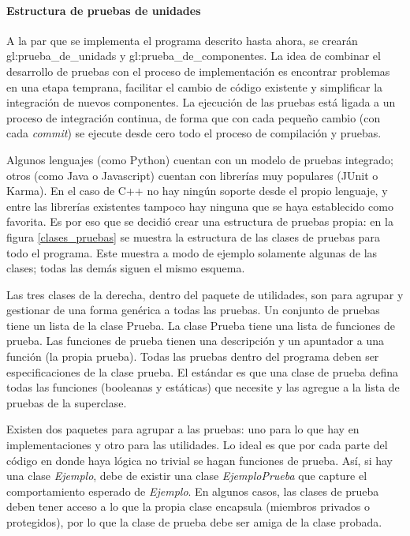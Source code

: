 %
%
%

\paragraph{Estructura de pruebas de unidades}

A la par que se implementa el programa descrito hasta ahora, se crearán
\glspl{gl:prueba_de_unidad} y \glspl{gl:prueba_de_componente}. La idea de
combinar el desarrollo de pruebas con el proceso de implementación es encontrar
problemas en una etapa temprana, facilitar el cambio de código existente y
simplificar la integración de nuevos componentes. La ejecución de las pruebas
está ligada a un proceso de integración continua, de forma que con
cada pequeño cambio (con cada \textit{commit}) se ejecute desde cero todo el
proceso de compilación y pruebas.

Algunos lenguajes (como Python) cuentan con un modelo de pruebas integrado;
otros (como Java o Javascript) cuentan con librerías muy populares (JUnit o
Karma). En el caso de C++ no hay ningún soporte desde el propio lenguaje, y
entre las librerías existentes tampoco hay ninguna que se haya establecido como
favorita. Es por eso que se decidió crear una estructura de pruebas propia:
en la figura \ref{clases_pruebas} se muestra la estructura de las clases de
pruebas para todo el programa. Este muestra a modo de ejemplo solamente algunas
de las clases; todas las demás siguen el mismo esquema.

Las tres clases de la derecha, dentro del paquete de utilidades, son para
agrupar y gestionar de una forma genérica a todas las pruebas. Un conjunto de
pruebas tiene un lista de la clase Prueba. La clase Prueba tiene una lista de
funciones de prueba. Las funciones de prueba tienen una descripción y un
apuntador a una función (la propia prueba). Todas las pruebas dentro del
programa deben ser especificaciones de la clase prueba. El estándar es que una
clase de prueba defina todas las funciones (booleanas y estáticas) que necesite
y las agregue a la lista de pruebas de la superclase.

Existen dos paquetes para agrupar a las pruebas: uno para lo que hay en
implementaciones y otro para las utilidades. Lo ideal es que por cada parte del
código en donde haya lógica no trivial se hagan funciones de prueba. Así, si hay
una clase \textit{Ejemplo}, debe de existir una clase \textit{EjemploPrueba}
que capture el comportamiento esperado de \textit{Ejemplo}. En algunos casos,
las clases de prueba deben tener acceso a lo que la propia clase encapsula
(miembros privados o protegidos), por lo que la clase de prueba debe ser amiga
de la clase probada.


